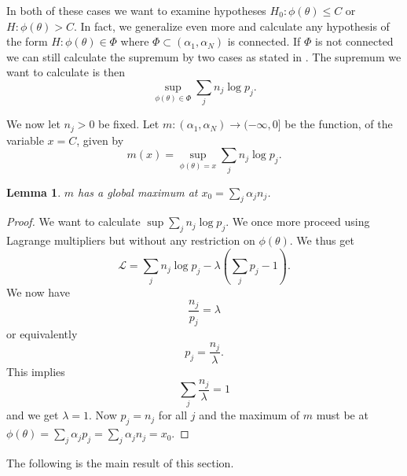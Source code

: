 \documentclass{article}
\theoremstyle{plain}
\newtheorem{lemma}       {\bf Lemma}       [section]
\theoremstyle{definition}
\begin{document}
In both of these cases we want to examine hypotheses $H_0:\phi(\theta)\leq C$ or
$H:\phi(\theta)>C$. In fact, we generalize even more and calculate any hypothesis
of the form
$H:\phi(\theta)\in\Phi$ where $\Phi\subset(\alpha_1,\alpha_N)$ is connected.
If $\Phi$ is not connected we can still calculate the supremum by two cases as stated in
.
The supremum we want to calculate is then $$\sup_{\phi(\theta)\in\Phi}\sum_jn_j\log p_j.$$

We now let $n_j>0$ be fixed. Let $m:(\alpha_1,\alpha_N)\to(-\infty,0]$ be the function, of
the variable
$x=C$, given by $$m(x)=\sup_{\phi(\theta)=x}\sum_jn_j\log p_j.$$

\begin{lemma}\label{mmax}
	$m$ has a global maximum at $x_0=\sum_j\alpha_jn_j$.
\end{lemma}
\begin{proof}
	We want to calculate $\sup\sum_jn_j\log p_j$. We once more proceed using Lagrange
	multipliers but without any restriction on $\phi(\theta)$. We thus get
	$$\mathcal L=\sum_jn_j\log p_j-\lambda\left(\sum_jp_j-1\right).$$
	We now have $$\frac{n_j}{p_j}=\lambda$$ or equivalently
	$$p_j=\frac{n_j}{\lambda}.$$ This implies $$\sum_j\frac{n_j}{\lambda}=1$$
	and we get $\lambda=1$. Now $p_j=n_j$ for all $j$ and the maximum of $m$ must be
	at $\phi(\theta)=\sum_j\alpha_jp_j=\sum_j\alpha_jn_j=x_0$.
\end{proof}

The following is the main result of this section.
\end{document}
